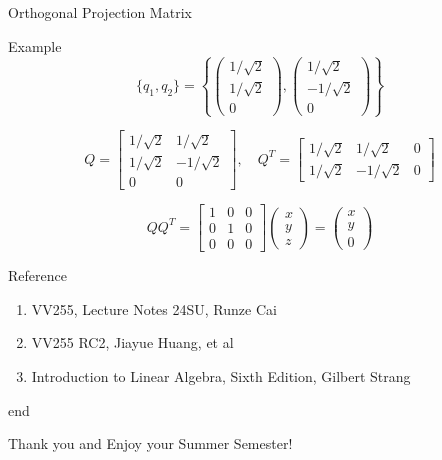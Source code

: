 \documentclass[aspectratio=169]{beamer}
\begin{document}
\begin{frame}{Orthogonal Projection Matrix}
\begin{block}{Example}
    $$
 \{q_1, q_2\} = \left\{ 
\begin{pmatrix} 1/\sqrt{2} \\ 1/\sqrt{2} \\ 0 \end{pmatrix}, 
\begin{pmatrix} 1/\sqrt{2} \\ -1/\sqrt{2} \\ 0 \end{pmatrix} 
\right\}
$$

$$
Q = \begin{bmatrix} 
1/\sqrt{2} & 1/\sqrt{2} \\ 
1/\sqrt{2} & -1/\sqrt{2} \\ 
0 & 0 
\end{bmatrix}, \quad 
Q^T = \begin{bmatrix} 
1/\sqrt{2} & 1/\sqrt{2} & 0 \\ 
1/\sqrt{2} & -1/\sqrt{2} & 0 
\end{bmatrix}
$$

$$
QQ^T = \begin{bmatrix} 
1 & 0 & 0 \\ 
0 & 1 & 0 \\ 
0 & 0 & 0 
\end{bmatrix}
\begin{pmatrix} x \\ y \\ z \end{pmatrix}
= 
\begin{pmatrix} x \\ y \\ 0 \end{pmatrix}
$$
\end{block}

\end{frame}


\begin{frame}{Reference}
    \begin{enumerate}
        \item VV255, Lecture Notes 24SU, Runze Cai
        \item VV255 RC2, Jiayue Huang, et al
        \item Introduction to Linear Algebra, Sixth Edition, Gilbert Strang
    \end{enumerate}
\end{frame}

\begin{frame}{\textcolor{green!30!black}{end}}
    \begin{center}
        \LARGE Thank you and Enjoy your Summer Semester!
    \end{center}
\end{frame}
\end{document}
